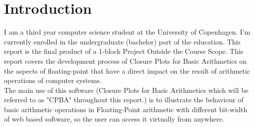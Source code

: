 \documentclass[11pt]{article}
\begin{document}

\newpage
\begin{center}
\tableofcontents
\end{center}

\newpage
\section{Introduction}
I am a third year computer science student at the University of Copenhagen. I'm currently enrolled in the undergraduate (bachelor) part of the education. This report is the final product of a 1-block Project Outside the Course Scope. This report covers the development process of Closure Plots for Basic Arithmetics on the aspects of floating-point that have a direct impact on the result of arithmetic operations of computer systems.\\

The main use of this software (Closure Plots for Basic Arithmetics which will be referred to as "CPBA" throughout this report.) is to illustrate the behaviour of basic arithmetic operations in Floating-Point arithmetic with different bit-width of web based software, so the user can access it virtually from anywhere.\\
\end{document}
